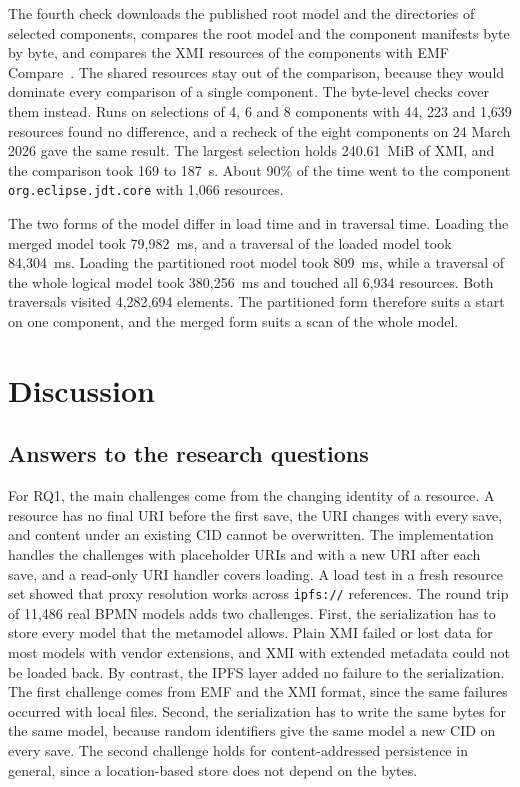 \documentclass[5p,times,twocolumn]{elsarticle}
\theoremstyle{definition}
\theoremstyle{plain}
\begin{document}
The fourth check downloads the published root model and the directories of selected components, compares the root model and the component manifests byte by byte, and compares the XMI resources of the components with EMF Compare~\cite{emfcompare}. The shared resources stay out of the comparison, because they would dominate every comparison of a single component. The byte-level checks cover them instead. Runs on selections of 4, 6 and 8 components with 44, 223 and 1,639 resources found no difference, and a recheck of the eight components on 24 March 2026 gave the same result. The largest selection holds 240.61~MiB of XMI, and the comparison took 169 to 187~s. About 90\% of the time went to the component \texttt{org.eclipse.jdt.core} with 1,066 resources.

The two forms of the model differ in load time and in traversal time. Loading the merged model took 79,982~ms, and a traversal of the loaded model took 84,304~ms. Loading the partitioned root model took 809~ms, while a traversal of the whole logical model took 380,256~ms and touched all 6,934 resources. Both traversals visited 4,282,694 elements. The partitioned form therefore suits a start on one component, and the merged form suits a scan of the whole model.

\section{Discussion}\label{sec:discussion}

\subsection{Answers to the research questions}\label{sec:answers}

For RQ1, the main challenges come from the changing identity of a resource. A resource has no final URI before the first save, the URI changes with every save, and content under an existing CID cannot be overwritten. The implementation handles the challenges with placeholder URIs and with a new URI after each save, and a read-only URI handler covers loading. A load test in a fresh resource set showed that proxy resolution works across \texttt{ipfs://} references. The round trip of 11,486 real BPMN models adds two challenges. First, the serialization has to store every model that the metamodel allows. Plain XMI failed or lost data for most models with vendor extensions, and XMI with extended metadata could not be loaded back. By contrast, the IPFS layer added no failure to the serialization. The first challenge comes from EMF and the XMI format, since the same failures occurred with local files. Second, the serialization has to write the same bytes for the same model, because random identifiers give the same model a new CID on every save. The second challenge holds for content-addressed persistence in general, since a location-based store does not depend on the bytes.
\end{document}
